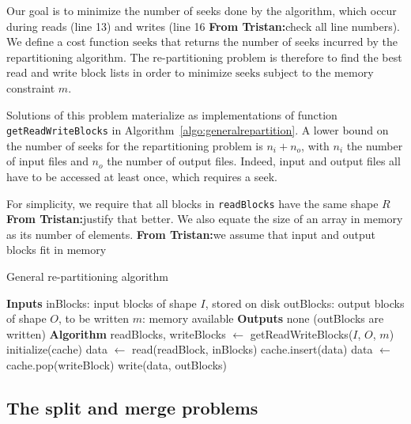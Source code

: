\documentclass[sigconf, nonacm]{acmart}
\newcommand{\tristan}[1]{\color{orange}\textbf{From Tristan:}#1\color{black}}
\begin{document}
Our goal is to minimize the number of seeks done by the algorithm, which
occur during reads (line 13) and writes (line 16 \tristan{check all line numbers}). We define a cost
function $\mathrm{seeks}$ that returns the number of seeks incurred by the
repartitioning algorithm. 
The re-partitioning problem is therefore to find
the best read and write block lists in order to minimize $\mathrm{seeks}$
subject to the memory constraint $m$. 


Solutions of this problem materialize as implementations of function
\texttt{getReadWriteBlocks} in Algorithm~\ref{algo:generalrepartition}. A
lower bound on the number of seeks for the repartitioning problem is $n_i +
n_o$, with $n_i$ the number of input files and $n_o$ the number of output
files. Indeed, input and output files all have to be accessed at least
once, which requires a seek.

For simplicity, we require that all blocks in \texttt{readBlocks} have
the same shape $R$ \tristan{justify that better}. We also equate the size of an
array in memory as its number of elements.
\tristan{we assume that input and output blocks fit in memory}

\begin{algorithm}
  \caption{General re-partitioning algorithm}
  \label{algo:generalrepartition}
  \begin{algorithmic}[1]
    \STATE \textbf{Inputs}
    \STATE inBlocks: input blocks of shape $I$, stored on disk
    \STATE outBlocks: output blocks of shape $O$, to be written
    \STATE $m$: memory available
    \STATE
    \STATE \textbf{Outputs}
    \STATE none (outBlocks are written)
    \STATE
    \STATE \textbf{Algorithm}
    \STATE readBlocks, writeBlocks $\leftarrow$ getReadWriteBlocks($I$, $O$, $m$)
    \STATE initialize(cache)
      \STATE data $\leftarrow$ read(readBlock, inBlocks)
      \STATE cache.insert(data)
          \STATE data $\leftarrow$ cache.pop(writeBlock)
          \STATE write(data, outBlocks)
        \ENDIF
      \ENDFOR
    \ENDFOR

  \end{algorithmic}
\end{algorithm}

\subsection{The split and merge problems}
\end{document}

